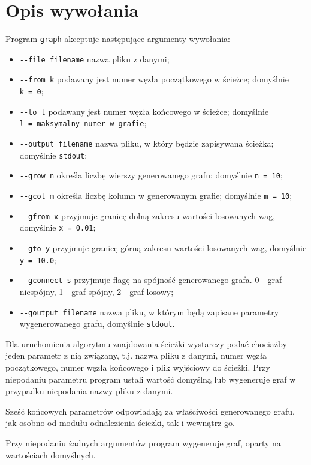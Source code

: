 \documentclass[]{article}
\begin{document}
\section{Opis wywołania}\label{header-n233}
Program \texttt{graph} akceptuje następujące argumenty wywołania:

\begin{itemize}
\item
  \texttt{-{}-file\ filename} nazwa pliku z danymi;
\item
  \texttt{-{}-from\ k} podawany jest numer węzła początkowego w ścieżce; domyślnie \texttt{k\ =\ 0};
\item
  \texttt{-{}-to\ l} podawany jest numer węzła końcowego w ścieżce; domyślnie \texttt{l\ =\ maksymalny numer w grafie};
\item
  \texttt{-{}-output\ filename} nazwa pliku, w który będzie zapisywana ścieżka; domyślnie \texttt{stdout};
\item
  \texttt{-{}-grow\ n} określa liczbę wierszy generowanego grafu; domyślnie \texttt{n\ =\ 10};
\item
  \texttt{-{}-gcol\ m} określa liczbę kolumn w generowanym grafie; domyślnie \texttt{m\ =\ 10};
\item
  \texttt{-{}-gfrom\ x} przyjmuje granicę dolną zakresu wartości losowanych wag, domyślnie \texttt{x\ =\ 0.01};
\item
  \texttt{-{}-gto\ y} przyjmuje granicę górną zakresu wartości losowanych wag, domyślnie \texttt{y\ =\ 10.0};
\item
  \texttt{-{}-gconnect\ s} przyjmuje flagę na spójność generowanego grafa. 0 - graf niespójny, 1 - graf spójny, 2 - graf losowy;
\item
  \texttt{-{}-goutput\ filename} nazwa pliku, w którym będą zapisane parametry wygenerowanego grafu, domyślnie \texttt{stdout}.
\end{itemize}
Dla uruchomienia algorytmu znajdowania ścieżki wystarczy podać chociażby jeden parametr z nią związany, t.j. nazwa pliku z danymi, numer węzła początkowego, numer węzła końcowego i plik wyjściowy do ścieżki. Przy niepodaniu parametru program ustali wartość domyślną lub wygeneruje graf w przypadku niepodania nazwy pliku z danymi.

Sześć końcowych parametrów odpowiadają za właściwości generowanego grafu, jak osobno od modułu odnalezienia ścieżki, tak i wewnątrz go.

Przy niepodaniu żadnych argumentów program wygeneruje graf, oparty na wartościach domyślnych.
\end{document}
